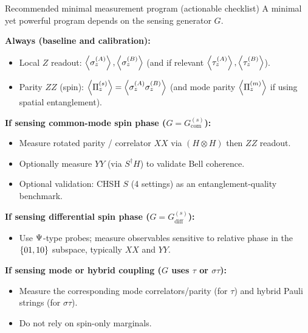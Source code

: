 \documentclass[aspectratio=169]{beamer}
\newcommand{\sA}[1]{\sigma_{#1}^{(A)}}
\newcommand{\sB}[1]{\sigma_{#1}^{(B)}}
\newcommand{\tA}[1]{\tau_{#1}^{(A)}}
\newcommand{\tB}[1]{\tau_{#1}^{(B)}}
\newcommand{\GcomS}{G_{\mathrm{com}}^{(s)}}
\newcommand{\GdiffS}{G_{\mathrm{diff}}^{(s)}}
\newcommand{\PiZs}{\Pi_{z}^{(s)}}
\newcommand{\PiZm}{\Pi_{z}^{(m)}}
\begin{document}
\begin{frame}{Recommended minimal measurement program (actionable checklist)}
\small
A minimal yet powerful program depends on the sensing generator $G$.

\vspace{0.25em}
\textbf{Always (baseline and calibration):}
\begin{itemize}
\item Local $Z$ readout: $\expval{\sA{z}},\expval{\sB{z}}$ (and if relevant $\expval{\tA{z}},\expval{\tB{z}}$).
\item Parity $ZZ$ (spin): $\expval{\PiZs}=\expval{\sA{z}\sB{z}}$ (and mode parity $\expval{\PiZm}$ if using spatial entanglement).
\end{itemize}

\vspace{0.25em}
\textbf{If sensing common-mode spin phase ($G=\GcomS$):}
\begin{itemize}
\item Measure rotated parity / correlator $XX$ via $(H\otimes H)$ then $ZZ$ readout.
\item Optionally measure $YY$ (via $S^\dagger H$) to validate Bell coherence.
\item Optional validation: CHSH $S$ (4 settings) as an entanglement-quality benchmark.
\end{itemize}

\vspace{0.25em}
\textbf{If sensing differential spin phase ($G=\GdiffS$):}
\begin{itemize}
\item Use $\relax{\Psi}$-type probes; measure observables sensitive to relative phase in the $\{\relax{01},\relax{10}\}$ subspace, typically $XX$ and $YY$.
\end{itemize}

\vspace{0.25em}
\textbf{If sensing mode or hybrid coupling ($G$ uses $\tau$ or $\sigma\tau$):}
\begin{itemize}
\item Measure the corresponding mode correlators/parity (for $\tau$) and hybrid Pauli strings (for $\sigma\tau$).
\item Do not rely on spin-only marginals.
\end{itemize}
\end{frame}
\end{document}
